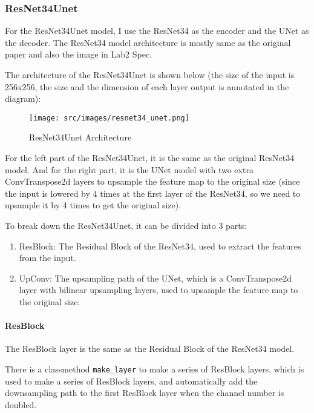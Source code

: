 \subsubsection{ResNet34Unet}
For the ResNet34Unet model, I use the ResNet34 as the encoder and the UNet as the decoder. The ResNet34 model architecture is mostly same as the original paper and also the image in Lab2 Spec.

The architecture of the ResNet34Unet is shown below (the size of the input is 256x256, the size and the dimension of each layer output is annotated in the diagram):
\begin{figure}[H] \label{fig:resnet34_unet}
    \centering
    \texttt{[image: src/images/resnet34\_unet.png]}
    \caption{ResNet34Unet Architecture}
\end{figure}

For the left part of the ResNet34Unet, it is the same as the original ResNet34 model. And for the right part, it is the UNet model with two extra ConvTranspose2d layers to upsample the feature map to the original size (since the input is lowered by 4 times at the first layer of the ResNet34, so we need to upsample it by 4 times to get the original size).

To break down the ResNet34Unet, it can be divided into 3 parts:
\begin{enumerate}
    \item ResBlock: The Residual Block of the ResNet34, used to extract the features from the input.
    \item UpConv: The upsampling path of the UNet, which is a ConvTranspose2d layer with bilinear upsampling layers, used to upsample the feature map to the original size.
\end{enumerate}

\paragraph{ResBlock}
The ResBlock layer is the same as the Residual Block of the ResNet34 model.

There is a classmethod \texttt{make\_layer} to make a series of ResBlock layers, which is used to make a series of ResBlock layers, and automatically add the downsampling path to the first ResBlock layer when the channel number is doubled.

